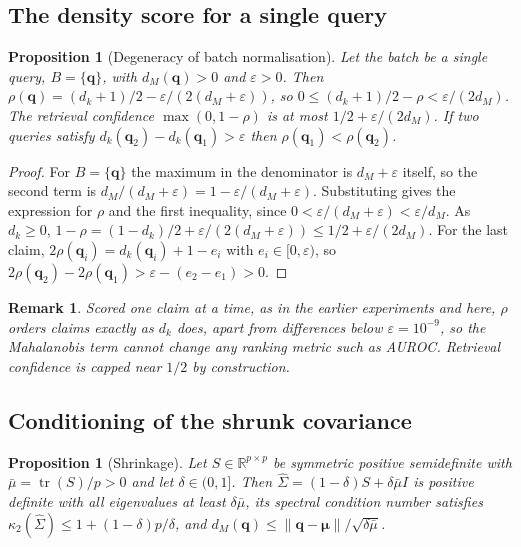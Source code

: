 \documentclass[11pt,a4paper]{article}
\newtheorem{proposition}[theorem]{Proposition}
\newtheorem{remark}{Remark}
\begin{document}
\subsection{The density score for a single query}

\begin{proposition}[Degeneracy of batch normalisation]
Let the batch be a single query, $B = \{\mathbf{q}\}$, with $d_M(\mathbf{q}) > 0$ and $\varepsilon > 0$. Then $\rho(\mathbf{q}) = (d_k + 1)/2 - \varepsilon / (2(d_M + \varepsilon))$, so $0 \le (d_k+1)/2 - \rho < \varepsilon/(2 d_M)$. The retrieval confidence $\max(0, 1-\rho)$ is at most $1/2 + \varepsilon/(2 d_M)$. If two queries satisfy $d_k(\mathbf{q}_2) - d_k(\mathbf{q}_1) > \varepsilon$ then $\rho(\mathbf{q}_1) < \rho(\mathbf{q}_2)$.
\end{proposition}

\begin{proof}
For $B = \{\mathbf{q}\}$ the maximum in the denominator is $d_M + \varepsilon$ itself, so the second term is $d_M/(d_M+\varepsilon) = 1 - \varepsilon/(d_M+\varepsilon)$. Substituting gives the expression for $\rho$ and the first inequality, since $0 < \varepsilon/(d_M+\varepsilon) < \varepsilon/d_M$. As $d_k \ge 0$, $1 - \rho = (1-d_k)/2 + \varepsilon/(2(d_M+\varepsilon)) \le 1/2 + \varepsilon/(2 d_M)$. For the last claim, $2\rho(\mathbf{q}_i) = d_k(\mathbf{q}_i) + 1 - e_i$ with $e_i \in [0, \varepsilon)$, so $2\rho(\mathbf{q}_2) - 2\rho(\mathbf{q}_1) > \varepsilon - (e_2 - e_1) > 0$.
\end{proof}

\begin{remark}
Scored one claim at a time, as in the earlier experiments and here, $\rho$ orders claims exactly as $d_k$ does, apart from differences below $\varepsilon = 10^{-9}$, so the Mahalanobis term cannot change any ranking metric such as AUROC. Retrieval confidence is capped near $1/2$ by construction.
\end{remark}

\subsection{Conditioning of the shrunk covariance}

\begin{proposition}[Shrinkage]
Let $S \in \mathbb{R}^{p \times p}$ be symmetric positive semidefinite with $\bar{\mu} = \operatorname{tr}(S)/p > 0$ and let $\delta \in (0, 1]$. Then $\hat{\Sigma} = (1-\delta)S + \delta\bar{\mu}I$ is positive definite with all eigenvalues at least $\delta\bar{\mu}$, its spectral condition number satisfies $\kappa_2(\hat{\Sigma}) \le 1 + (1-\delta)p/\delta$, and $d_M(\mathbf{q}) \le \lVert \mathbf{q} - \boldsymbol{\mu} \rVert / \sqrt{\delta\bar{\mu}}$.
\end{proposition}
\end{document}
